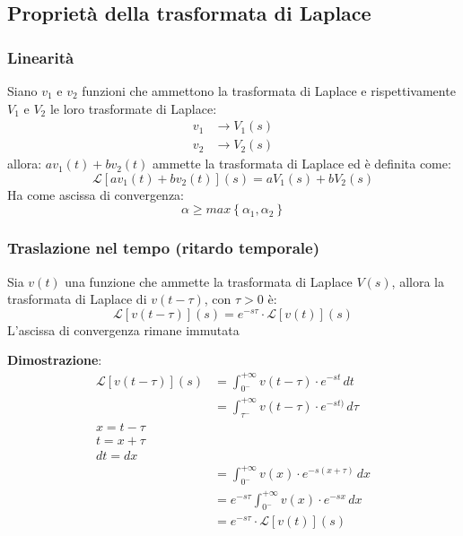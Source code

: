 \documentclass[a4paper]{article}
\begin{document}
\subsection{Proprietà della trasformata di Laplace}
\subsubsection{Linearità}
  Siano \( v_1 \) e \( v_2 \)  funzioni che ammettono la trasformata di Laplace e 
  rispettivamente \( V_1 \) e \( V_2 \) le loro trasformate di Laplace:
  \[
    \begin{aligned}
      v_1 &\to V_1(s)\\
      v_2 &\to V_2(s)
    \end{aligned}
  \] 
  allora: $a v_1(t) + b v_2(t)$ ammette la trasformata di Laplace ed è definita come:
  \[
    \mathcal{L}[a v_1(t) + b v_2(t)](s) = a V_1(s) + b V_2(s)
  \] 
  Ha come ascissa di convergenza:
  \[
    \alpha \ge max \left\{ \alpha_1,\alpha_2 \right\} 
  \] 

\subsubsection{Traslazione nel tempo (ritardo temporale)}
  Sia \( v(t) \) una funzione che ammette la trasformata di Laplace \( V(s) \), allora
  la trasformata di Laplace di \( v(t - \tau) \), con \( \tau > 0 \) è:
  \[
    \mathcal{L}[v(t - \tau)](s) = e^{-s \tau} \cdot \mathcal{L}[v(t)](s)
  \] 
  L'ascissa di convergenza rimane immutata

  \vspace{1em}
  \noindent
  \textbf{Dimostrazione}:
  \[
    \begin{aligned}
      \mathcal{L}[v(t-\tau)](s) &= \int_{0^-}^{+\infty} v(t-\tau) \cdot e^{-st} \, dt\\
                                &= \int_{\tau^-}^{+\infty} v(t-\tau) \cdot e^{-st)} \, d\tau\\
                                x = t - \tau\\
                                t = x + \tau\\
                                dt = dx\\
                                &= \int_{0^-}^{+\infty} v(x) \cdot e^{-s(x+\tau)} \, dx\\
                                &= e^{-s \tau} \int_{0^-}^{+\infty} v(x) \cdot e^{-sx} \, dx\\
                                &= e^{-s \tau} \cdot \mathcal{L}[v(t)](s)
    \end{aligned}
  \] 
\end{document}
